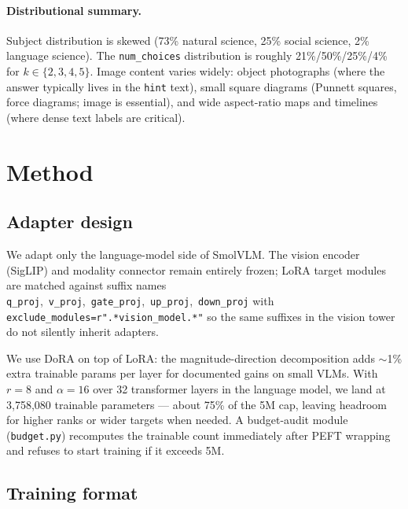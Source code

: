 \documentclass[11pt]{article}
\begin{document}
\paragraph{Distributional summary.} Subject distribution is skewed (73\% natural science, 25\% social science, 2\% language science). The \texttt{num\_choices} distribution is roughly 21\%/50\%/25\%/4\% for $k\in\{2,3,4,5\}$. Image content varies widely: object photographs (where the answer typically lives in the \texttt{hint} text), small square diagrams (Punnett squares, force diagrams; image is essential), and wide aspect-ratio maps and timelines (where dense text labels are critical).

\section{Method}

\subsection{Adapter design}

We adapt only the language-model side of SmolVLM. The vision encoder (SigLIP) and modality connector remain entirely frozen; LoRA target modules are matched against suffix names \texttt{q\_proj},\allowbreak\ \texttt{v\_proj},\allowbreak\ \texttt{gate\_proj},\allowbreak\ \texttt{up\_proj},\allowbreak\ \texttt{down\_proj} with \texttt{exclude\_modules=}\allowbreak\texttt{r".*vision\_model.*"} so the same suffixes in the vision tower do not silently inherit adapters.

We use DoRA \citep{liu2024dora} on top of LoRA: the magnitude-direction decomposition adds $\sim$1\% extra trainable params per layer for documented gains on small VLMs. With $r=8$ and $\alpha=16$ over 32 transformer layers in the language model, we land at 3,758,080 trainable parameters --- about 75\% of the 5M cap, leaving headroom for higher ranks or wider targets when needed. A budget-audit module (\texttt{budget.py}) recomputes the trainable count immediately after PEFT wrapping and refuses to start training if it exceeds 5M.

\subsection{Training format}
\end{document}

